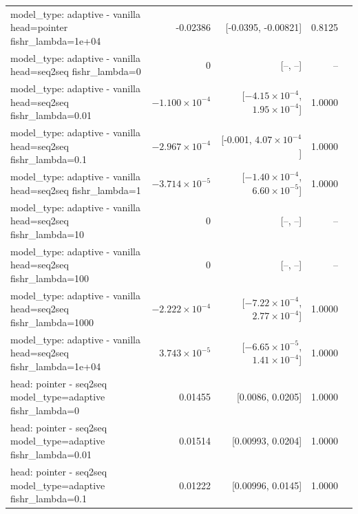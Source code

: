 \documentclass[10pt]{article}
\makeatletter
\newcommand{\stackcell}[1]{\begin{tabular}[t]{@{}l@{}}#1\end{tabular}}
\makeatother
\begin{document}
{\begin{longtable}{lrrrl}
\stackcell{model\_type: adaptive - vanilla\\\footnotesize head=pointer fishr\_lambda=1e+04 } & -0.02386 & [-0.0395, -0.00821] & 0.8125 & \\
\stackcell{model\_type: adaptive - vanilla\\\footnotesize head=seq2seq fishr\_lambda=0 } & 0 & [--, --] & -- & \\
\stackcell{model\_type: adaptive - vanilla\\\footnotesize head=seq2seq fishr\_lambda=0.01 } & $-1.100\times10^{-4}$ & [$-4.15\times10^{-4}$, $1.95\times10^{-4}$] & 1.0000 & \\
\stackcell{model\_type: adaptive - vanilla\\\footnotesize head=seq2seq fishr\_lambda=0.1 } & $-2.967\times10^{-4}$ & [-0.001, $4.07\times10^{-4}$] & 1.0000 & \\
\stackcell{model\_type: adaptive - vanilla\\\footnotesize head=seq2seq fishr\_lambda=1 } & $-3.714\times10^{-5}$ & [$-1.40\times10^{-4}$, $6.60\times10^{-5}$] & 1.0000 & \\
\stackcell{model\_type: adaptive - vanilla\\\footnotesize head=seq2seq fishr\_lambda=10 } & 0 & [--, --] & -- & \\
\stackcell{model\_type: adaptive - vanilla\\\footnotesize head=seq2seq fishr\_lambda=100 } & 0 & [--, --] & -- & \\
\stackcell{model\_type: adaptive - vanilla\\\footnotesize head=seq2seq fishr\_lambda=1000 } & $-2.222\times10^{-4}$ & [$-7.22\times10^{-4}$, $2.77\times10^{-4}$] & 1.0000 & \\
\stackcell{model\_type: adaptive - vanilla\\\footnotesize head=seq2seq fishr\_lambda=1e+04 } & $3.743\times10^{-5}$ & [$-6.65\times10^{-5}$, $1.41\times10^{-4}$] & 1.0000 & \\
\stackcell{head: pointer - seq2seq\\\footnotesize model\_type=adaptive fishr\_lambda=0 } & 0.01455 & [0.0086, 0.0205] & 1.0000 & \\
\stackcell{head: pointer - seq2seq\\\footnotesize model\_type=adaptive fishr\_lambda=0.01 } & 0.01514 & [0.00993, 0.0204] & 1.0000 & \\
\stackcell{head: pointer - seq2seq\\\footnotesize model\_type=adaptive fishr\_lambda=0.1 } & 0.01222 & [0.00996, 0.0145] & 1.0000 & \\

\end{longtable}}
\end{document}
